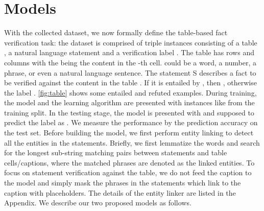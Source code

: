 \documentclass{article} \usepackage{iclr2020_conference,times}
\begin{document}
\section{Models}
With the collected dataset, we now formally define the table-based fact verification task: the dataset is comprised of triple instances  consisting of a table , a natural language statement  and a verification label . The table  has  rows and  columns with the  being the content in the -th cell.  could be a word, a number, a phrase, or even a natural language sentence. The statement S describes a fact to be verified against the content in the table . If it is entailed by , then , otherwise the label . \autoref{fig:table} shows some entailed and refuted examples. During training, the model and the learning algorithm are presented with  instances like  from the training split. In the testing stage, the model is presented with  and supposed to predict the label as . We measure the performance by the prediction accuracy  on the test set. Before building the model, we first perform entity linking to detect all the entities in the statements. Briefly, we first lemmatize the words and search for the longest sub-string matching pairs between statements and table cells/captions, where the matched phrases are denoted as the linked entities. To focus on statement verification against the table, we do not feed the caption to the model and simply mask the phrases in the statements which link to the caption with placeholders. The details of the entity linker are listed in the Appendix. We describe our two proposed models as follows.
\end{document}

